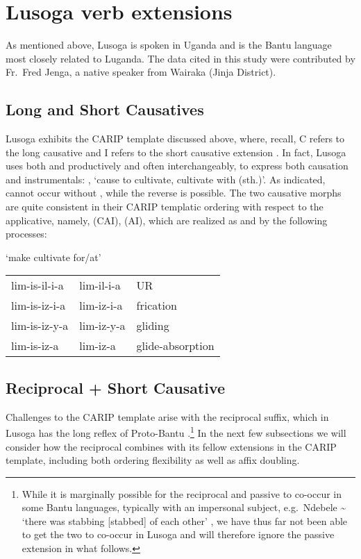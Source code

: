 \documentclass[output=paper,
modfonts
]{LSP/langsci}
\begin{document}
\section{Lusoga verb extensions}

As mentioned above, Lusoga is spoken in Uganda and is the Bantu language
most closely related to Luganda. The data cited in this study were
contributed by Fr.\ Fred Jenga, a native speaker from Wairaka (Jinja
District).

\subsection{Long and Short Causatives}

Lusoga exhibits the CARIP template discussed above, where, recall, C
refers to the long causative  and I refers to the short
causative extension . In fact, Lusoga uses both 
and  productively and often interchangeably, to express both
causation and instrumentals: ,  `cause to
cultivate, cultivate with (sth.)'. As indicated,  cannot
occur without , while the reverse is possible. The two
causative morphs are quite consistent in their CARIP templatic ordering
with respect to the applicative, namely,  (CAI),
 (AI), which are realized as  and 
by the following processes:

\ea `make cultivate for/at'\\
\begin{tabular}[t]{@{}lll@{}}
	lim-is-il-i-a & lim-il-i-a & UR \\
	lim-is-iz-i-a & lim-iz-i-a & frication \\
	lim-is-iz-y-a & lim-iz-y-a & gliding \\
	lim-is-iz-a & lim-iz-a & glide-absorption \\
\end{tabular}%
\z

\subsection{Reciprocal + Short Causative}

Challenges to the CARIP template arise with the reciprocal suffix, which
in Lusoga has the long reflex  of Proto-Bantu
.\footnote{While it is marginally possible for the
  reciprocal and passive to co-occur in some Bantu languages, typically
  with an impersonal subject, e.g.\ Ndebele 
  \textasciitilde{}  `there was stabbing
  [stabbed] of each other' \citep[66]{sibanda2004}, we have thus far not
  been able to get the two to co-occur in Lusoga and will therefore ignore
  the passive extension in what follows.} In the next few subsections we
will consider how the reciprocal combines with its fellow extensions in
the CARIP template, including both ordering flexibility as well as affix
doubling.
\end{document}
